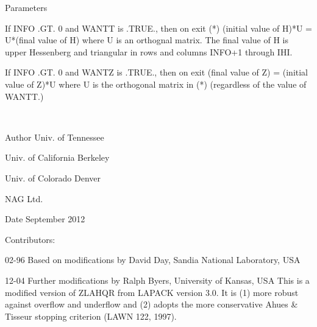 \begin{DoxyParams}[1]{Parameters}
\begin{DoxyVerb}
                  If INFO .GT. 0 and WANTT is .TRUE., then on exit
          (*)       (initial value of H)*U  = U*(final value of H)
                  where U is an orthognal matrix.    The final
                  value of H is upper Hessenberg and triangular in
                  rows and columns INFO+1 through IHI.

                  If INFO .GT. 0 and WANTZ is .TRUE., then on exit
                      (final value of Z)  = (initial value of Z)*U
                  where U is the orthogonal matrix in (*)
                  (regardless of the value of WANTT.)\end{DoxyVerb}
 \\
\hline
\end{DoxyParams}
\begin{DoxyAuthor}{Author}
Univ. of Tennessee 

Univ. of California Berkeley 

Univ. of Colorado Denver 

N\+A\+G Ltd. 
\end{DoxyAuthor}
\begin{DoxyDate}{Date}
September 2012 
\end{DoxyDate}
\begin{DoxyParagraph}{Contributors\+: }
\begin{DoxyVerb}     02-96 Based on modifications by
     David Day, Sandia National Laboratory, USA

     12-04 Further modifications by
     Ralph Byers, University of Kansas, USA
     This is a modified version of ZLAHQR from LAPACK version 3.0.
     It is (1) more robust against overflow and underflow and
     (2) adopts the more conservative Ahues & Tisseur stopping
     criterion (LAWN 122, 1997).\end{DoxyVerb}
 
\end{DoxyParagraph}
